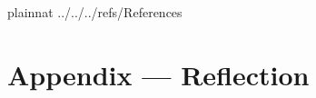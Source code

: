 \documentclass[12pt, titlepage]{article}
\begin{document}
\newpage

 {plainnat}
 {../../../refs/References}

\newpage

\section*{Appendix --- Reflection}



\end{document}
